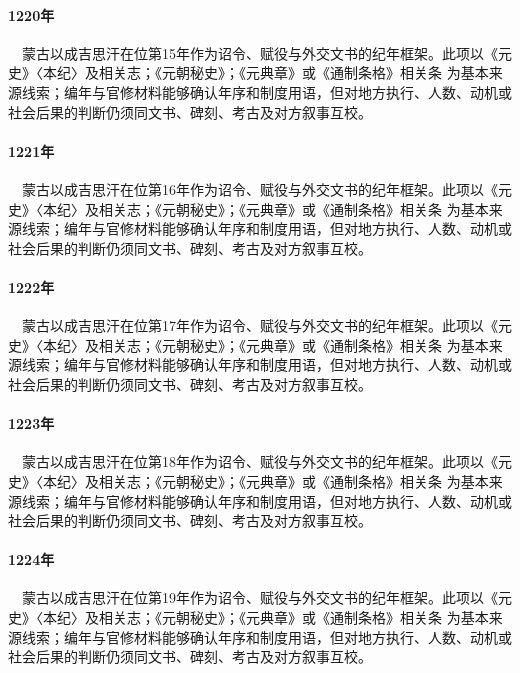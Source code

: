 \paragraph{1220年}　蒙古以成吉思汗在位第15年作为诏令、赋役与外交文书的纪年框架。此项以《元史》〈本纪〉及相关志；《元朝秘史》；《元典章》或《通制条格》相关条 为基本来源线索；编年与官修材料能够确认年序和制度用语，但对地方执行、人数、动机或社会后果的判断仍须同文书、碑刻、考古及对方叙事互校。

\paragraph{1221年}　蒙古以成吉思汗在位第16年作为诏令、赋役与外交文书的纪年框架。此项以《元史》〈本纪〉及相关志；《元朝秘史》；《元典章》或《通制条格》相关条 为基本来源线索；编年与官修材料能够确认年序和制度用语，但对地方执行、人数、动机或社会后果的判断仍须同文书、碑刻、考古及对方叙事互校。

\paragraph{1222年}　蒙古以成吉思汗在位第17年作为诏令、赋役与外交文书的纪年框架。此项以《元史》〈本纪〉及相关志；《元朝秘史》；《元典章》或《通制条格》相关条 为基本来源线索；编年与官修材料能够确认年序和制度用语，但对地方执行、人数、动机或社会后果的判断仍须同文书、碑刻、考古及对方叙事互校。

\paragraph{1223年}　蒙古以成吉思汗在位第18年作为诏令、赋役与外交文书的纪年框架。此项以《元史》〈本纪〉及相关志；《元朝秘史》；《元典章》或《通制条格》相关条 为基本来源线索；编年与官修材料能够确认年序和制度用语，但对地方执行、人数、动机或社会后果的判断仍须同文书、碑刻、考古及对方叙事互校。

\paragraph{1224年}　蒙古以成吉思汗在位第19年作为诏令、赋役与外交文书的纪年框架。此项以《元史》〈本纪〉及相关志；《元朝秘史》；《元典章》或《通制条格》相关条 为基本来源线索；编年与官修材料能够确认年序和制度用语，但对地方执行、人数、动机或社会后果的判断仍须同文书、碑刻、考古及对方叙事互校。

